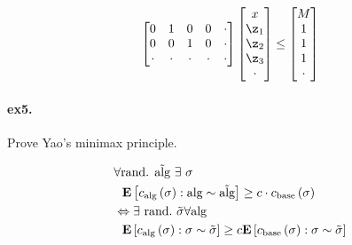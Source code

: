 \documentclass{article}
\begin{document}
\begin{multicols*}{2}
\begin{equation*}
\begin{split}
\begin{bmatrix}
	0 & 1 & 0 & 0 & \cdot \\
	0 & 0 & 1 & 0 & \cdot \\
	\cdot & \cdot & \cdot & \cdot & \cdot
      \end{bmatrix} 
      \begin{bmatrix}
	x \\
	\z_{1} \\ 
	\z_{2} \\
	\z_{3} \\
	\cdot 
      \end{bmatrix} \le
      \begin{bmatrix}
	M \\
	1 \\ 
	1 \\
	1 \\
	\cdot 
      \end{bmatrix}
    \end{split}
  \end{equation*}

  \paragraph{ex5.} Prove Yao's minimax principle. 

  \begin{equation*}
    \begin{split}
      & \forall \text{rand. } \tilde{\text{alg}} \  \exists  \ \sigma  \\
      & \ \ \dalg{ \calg\left( \sigma \right) } \ge c \cdot   \cbase\left( \sigma \right) \\  
      & \Leftrightarrow \exists \ \text{rand.} \ \tilde{\sigma} \forall \text{alg} \\  
      & \ \ \dsig{  \calg\left( \sigma \right)  } \ge c \dsig{ \cbase \left( \sigma \right)  } 
    \end{split}
  \end{equation*}

\end{multicols*}
\end{document}
